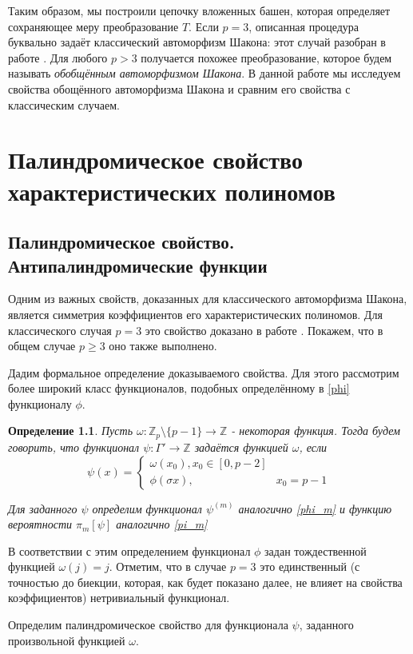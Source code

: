 \documentclass[14pt, a4paper, russian]{report}
\newtheorem{definition}{\indent Определение}
\begin{document}
Таким образом, мы построили цепочку вложенных башен, которая определяет сохраняющее меру преобразование $T$. Если $p=3$, описанная процедура буквально задаёт классический автоморфизм Шакона: этот случай разобран в работе \cite{weaklimits}. Для любого $p > 3$ получается похожее преобразование, которое будем называть \emph{обобщённым автоморфизмом Шакона}. В данной работе мы исследуем свойства обощённого автоморфизма Шакона и сравним его свойства с классическим случаем.

\chapter{Палиндромическое свойство характеристических полиномов}
\section{Палиндромическое свойство. Антипалиндромические функции}
Одним из важных свойств, доказанных для классического автоморфизма Шакона, является симметрия коэффициентов его характеристических полиномов. Для классического случая $p=3$  это свойство доказано в работе \cite{weaklimits}. Покажем, что в общем случае $p \ge 3$ оно также выполнено.

Дадим формальное определение доказываемого свойства. Для этого рассмотрим более широкий класс функционалов, подобных определённому в \cref{phi} функционалу $\phi$.
\begin{definition} \label{psi}
Пусть $\omega: \mathbb{Z}_p \setminus \{p-1\} \to \mathbb{Z}$ - некоторая функция. Тогда будем говорить, что функционал $\psi: \Gamma' \to \mathbb{Z}$ задаётся функцией $\omega$, если
$$
    \psi(x) = \begin{cases}
                    \omega(x_0),x_0 \in \left[0,  p - 2\right] \\
                    \phi(\sigma x), & x_0 = p - 1
                \end{cases}
$$

Для заданного $\psi$ определим функционал $\psi^{(m)}$ аналогично \cref{phi_m} и функцию вероятности $\pi_m[\psi]$ аналогично \cref{pi_m}
\end{definition}

В соответствии с этим определением функционал $\phi$ задан тождественной функцией $\omega(j)=j$. Отметим, что в случае $p=3$ это единственный (с точностью до биекции, которая, как будет показано далее, не влияет на свойства коэффициентов) нетривиальный функционал. 

Определим палиндромическое свойство для функционала $\psi$, заданного произвольной функцией $\omega$.
\end{document}
